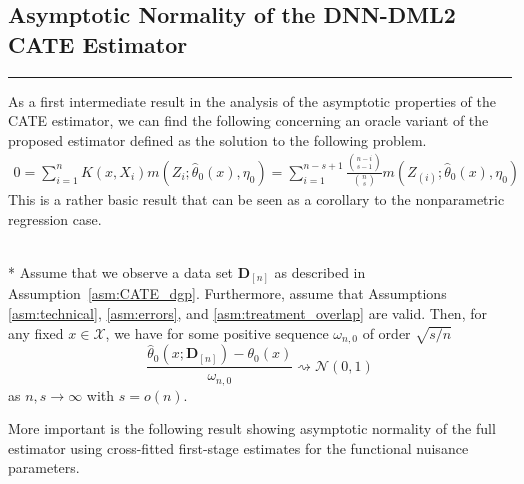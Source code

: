 \subsection{Asymptotic Normality of the DNN-DML2 CATE Estimator}\label{CATE_AsympNorm}
\hrule

As a first intermediate result in the analysis of the asymptotic properties of the CATE estimator, we can find the following concerning an oracle variant of the proposed estimator defined as the solution to the following problem.
\begin{equation}\label{eq:DNNDML2_Oracle}
    \begin{aligned}
        0 
        = \sum_{i = 1}^{n} K(x, X_{i}) m\left(Z_{i}; \hat{\theta}_{0}(x), \eta_{0}\right)
        = \sum_{i = 1}^{n - s + 1} \frac{\binom{n-i}{s-1}}{\binom{n}{s}} m\left(Z_{(i)}; \hat{\theta}_{0}(x),\eta_{0}\right)
    \end{aligned}
\end{equation}
This is a rather basic result that can be seen as a corollary to the nonparametric regression case.
\begin{boxD}
	\begin{thm}\label{thm:DNNDML2_anorm_0}\mbox{}\\*
		Assume that we observe a data set $\mathbf{D}_{[n]}$ as described in Assumption~\ref{asm:CATE_dgp}. 
        Furthermore, assume that Assumptions \ref{asm:technical}, \ref{asm:errors}, and \ref{asm:treatment_overlap} are valid.
		Then, for any fixed $x \in \mathcal{X}$, we have for some positive sequence $\omega_{n,0}$ of order $\sqrt{s/n}$
		\begin{equation}
			\frac{\hat{\theta}_{0}(x; \mathbf{D}_{[n]}) - \theta_{0}(x)}{\omega_{n,0}}
			\rightsquigarrow \mathcal{N}\left(0,1\right)
		\end{equation}
		as $n,s \rightarrow \infty$ with $s = o(n)$.
	\end{thm}
\end{boxD}
More important is the following result showing asymptotic normality of the full estimator using cross-fitted first-stage estimates for the functional nuisance parameters.
